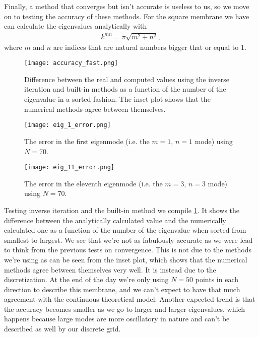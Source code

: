 \documentclass[10pt,a4paper,twocolumn]{article}
\begin{document}
Finally, a method that converges but isn't accurate is useless to us, so we move on to testing the accuracy of these methods. For the square membrane we have can calculate the eigenvalues analytically with
%
\begin{align}
    k^{mn} = \pi \sqrt{m^2 + n^2},
\end{align}
%
where $m$ and $n$ are indices that are natural numbers bigger that or equal to $1$.

\begin{figure}[!ht]
    \centering
    \texttt{[image: accuracy\_fast.png]}
    \caption{Difference between the real and computed values using the inverse iteration and built-in methods as a function of the number of the eigenvalue in a sorted fashion. The inset plot shows that the numerical methods agree between themselves.}
    \label{fig:acc}
\end{figure}

\begin{figure}[!hb]
    \centering
    \texttt{[image: eig\_1\_error.png]}
    \caption{The error in the first eigenmode (i.e. the $m=1$, $n=1$ mode) using $N=70$.}
    \label{fig:acc_1}
\end{figure}

\begin{figure}[!ht]
    \centering
    \texttt{[image: eig\_11\_error.png]}
    \caption{The error in the eleventh eigenmode (i.e. the $m=3$, $n=3$ mode) using $N=70$.}
    \label{fig:acc_11}
\end{figure}

Testing inverse iteration and the built-in method we compile \cref{fig:acc}. It shows the difference between the analytically calculated value and the numerically calculated one as a function of the number of the eigenvalue when sorted from smallest to largest. We see that we're not as fabulously accurate as we were lead to think from the previous tests on convergence. This is not due to the methods we're using as can be seen from the inset plot, which shows that the numerical methods agree between themselves very well. It is instead due to the discretization. At the end of the day we're only using $N=50$ points in each direction to describe this membrane, and we can't expect to have that much agreement with the continuous theoretical model. Another expected trend is that the accuracy becomes smaller as we go to larger and larger eigenvalues, which happens because large modes are more oscillatory in nature and can't be described as well by our discrete grid.
\end{document}
